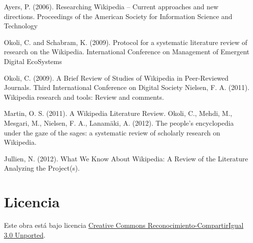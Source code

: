 \documentclass[11pt,twocolumn]{article}
\begin{document}
Ayers, P. (2006). Researching Wikipedia -- Current approaches and new directions. Proceedings of the American Society for Information Science and Technology

Okoli, C. and Schabram, K. (2009). Protocol for a systematic literature review of research on the Wikipedia. International Conference on Management of Emergent Digital EcoSystems

Okoli, C. (2009). A Brief Review of Studies of Wikipedia in Peer-Reviewed Journals. Third International Conference on Digital Society
Nielsen, F. A. (2011). Wikipedia research and tools: Review and comments.

Martin, O. S. (2011). A Wikipedia Literature Review.
Okoli, C., Mehdi, M., Mesgari, M., Nielsen, F. A.,  Lanam\"{a}ki, A. (2012). The people's encyclopedia under the gaze of the sages: a systematic review of scholarly research on Wikipedia.

Jullien, N. (2012). What We Know About Wikipedia: A Review of the Literature Analyzing the Project(s).

\section{Licencia}
Este obra está bajo licencia \href{http://creativecommons.org/licenses/by-sa/3.0/}{Creative Commons Reconocimiento-CompartirIgual 3.0 Unported}.
\end{document}

